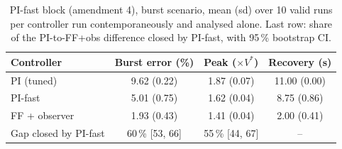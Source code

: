 \begin{table}[t]\centering\small
\caption{PI-fast block (amendment 4), burst scenario, mean (sd) over 10 valid runs per controller run contemporaneously and analysed alone. Last row: share of the PI-to-FF+obs difference closed by PI-fast, with 95\,\% bootstrap CI.}\label{tab:pifast}
\begin{tabular}{lccc}\toprule
Controller & Burst error (\%) & Peak ($\times V^*$) & Recovery (s)\\\midrule
PI (tuned) & 9.62 (0.22) & 1.87 (0.07) & 11.00 (0.00)\\
PI-fast & 5.01 (0.75) & 1.62 (0.04) & 8.75 (0.86)\\
FF + observer & 1.93 (0.43) & 1.41 (0.04) & 2.00 (0.41)\\\midrule
Gap closed by PI-fast & 60\,\% [53, 66] & 55\,\% [44, 67] & --\\
\bottomrule\end{tabular}\end{table}
